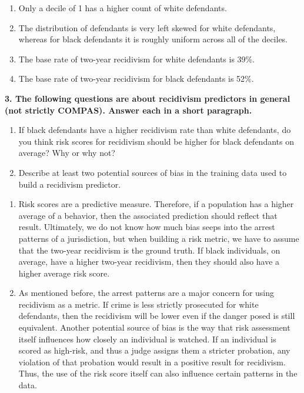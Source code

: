 \documentclass{article}
\begin{document}
\bigskip
\begin{mdframed}
\begin{enumerate}[label=\Alph*.]
\item Only a decile of 1 has a higher count of white defendants.
\item The distribution of defendants is very left skewed for white defendants, whereas for black defendants it is roughly uniform across all of the deciles.
\item The base rate of two-year recidivism for white defendants is 39\%.
\item The base rate of two-year recidivism for black defendants is 52\%.
\end{enumerate}
\end{mdframed}
\bigskip

\textbf{3. The following questions are about recidivism predictors in general (not strictly COMPAS). Answer each in a short paragraph.}
\begin{enumerate}[label=\Alph*.]
\item If black defendants have a higher recidivism rate than white defendants, do you think risk scores for recidivism should be higher for black defendants on average? Why or why not?
\item Describe at least two potential sources of bias in the training data used to build a recidivism predictor.
\end{enumerate}

\bigskip
\begin{mdframed}
\begin{enumerate}[label=\Alph*.]
\item Risk scores are a predictive measure. Therefore, if a population has a higher average of a behavior, then the associated prediction should reflect that result. Ultimately, we do not know how much bias seeps into the arrest patterns of a jurisdiction, but when building a risk metric, we have to assume that the two-year recidivism is the ground truth. If black individuals, on average, have a higher two-year recidivism, then they should also have a higher average risk score. 
\item As mentioned before, the arrest patterns are a major concern for using recidivism as a metric. If crime is less strictly prosecuted for white defendants, then the recidivism will be lower even if the danger posed is still equivalent. Another potential source of bias is the way that risk assessment itself influences how closely an individual is watched. If an individual is scored as high-risk, and thus a judge assigns them a stricter probation, any violation of that probation would result in a positive result for recidivism. Thus, the use of the risk score itself can also influence certain patterns in the data. 
\end{enumerate}
\end{mdframed}
\bigskip
\end{document}

